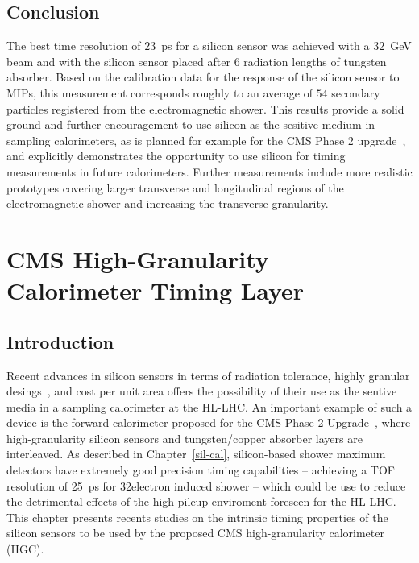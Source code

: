 \section{Conclusion}\label{sec:conclusion} 
The best time resolution of $23$~ps for a silicon sensor was achieved with a $32$~GeV beam 
and with the silicon sensor placed after 6 radiation
lengths of tungsten absorber. Based on the calibration data for the response of the
silicon sensor to MIPs, this measurement corresponds roughly to 
an average of $54$ secondary particles registered from the electromagnetic shower. 
This results provide a solid ground and further encouragement to use silicon as
the sesitive medium in sampling calorimeters, as is planned for example for the CMS Phase 2 
upgrade~\cite{Butler:2020886}, and explicitly demonstrates the opportunity 
to use silicon for timing measurements in future calorimeters. Further
measurements include more realistic prototypes covering larger transverse and longitudinal 
regions of the electromagnetic shower and increasing the transverse
granularity. 

\chapter{CMS High-Granularity Calorimeter Timing Layer}\label{chapter:HGC}
\section{Introduction}\label{hgc:intro}
Recent advances in silicon sensors in terms of radiation tolerance, highly granular desings~\cite{Adloff:2011ha}, and cost per unit area
offers the possibility of their use as the sentive media in a sampling
calorimeter at the HL-LHC. An important example of such a device is
the forward calorimeter proposed for the CMS Phase 2 Upgrade~\cite{Butler:2020886}, where
high-granularity silicon sensors and tungsten/copper absorber layers
are interleaved.
As described in Chapter~\ref{sil-cal}, silicon-based shower maximum
detectors have extremely good precision timing capabilities -- achieving a  TOF
resolution of 25~ps for 32\GeV electron induced shower -- which could
be use to reduce the detrimental effects of the high pileup enviroment
foreseen for the HL-LHC. This chapter presents recents studies on the
intrinsic timing properties of the silicon sensors to be used by the
proposed CMS high-granularity calorimeter (HGC).

